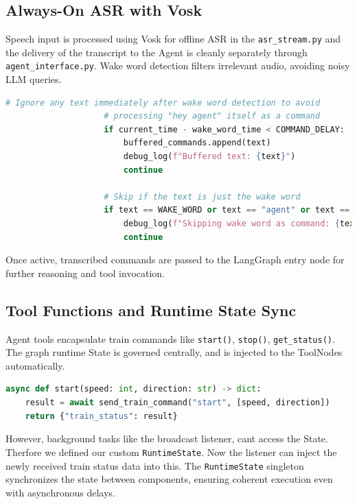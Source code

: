 \subsection{Always-On ASR with Vosk}

Speech input is processed using Vosk for offline ASR in the \texttt{asr\_stream.py} and the delivery of the transcript to the Agent is cleanly separately through \texttt{agent\_interface.py}. Wake word detection filters irrelevant audio, avoiding noisy LLM queries.

\begin{lstlisting}[language=Python, caption=Wake-word filtering]
# Ignore any text immediately after wake word detection to avoid
                    # processing "hey agent" itself as a command
                    if current_time - wake_word_time < COMMAND_DELAY:
                        buffered_commands.append(text)
                        debug_log(f"Buffered text: {text}")
                        continue

                    # Skip if the text is just the wake word
                    if text == WAKE_WORD or text == "agent" or text == "hey":
                        debug_log(f"Skipping wake word as command: {text}")
                        continue
\end{lstlisting}

Once active, transcribed commands are passed to the LangGraph entry node for further reasoning and tool invocation.

\subsection{Tool Functions and Runtime State Sync}

Agent tools encapsulate train commands like \texttt{start()}, \texttt{stop()}, \texttt{get\_status()}. The graph runtime State is governed centrally, and is injected to the ToolNodes automatically. 

\begin{lstlisting}[language=Python, caption=Train control tool call]
async def start(speed: int, direction: str) -> dict:
    result = await send_train_command("start", [speed, direction])
    return {"train_status": result}
\end{lstlisting}

However, background tasks like the broadcast listener, cant access the State. Therfore we defined our custom \texttt{RuntimeState}. Now the listener can inject the newly received train status data into this. The \texttt{RuntimeState} singleton synchronizes the state between components, ensuring coherent execution even with asynchronous delays.


